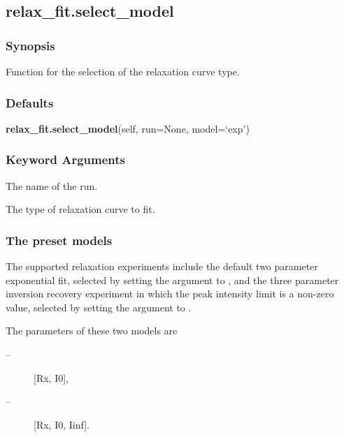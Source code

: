   

 \newpage 

 \subsection{relax\_fit.select\_model} 

  
 \subsubsection{Synopsis} 

 Function for the selection of the relaxation curve type. 
  

  
 \subsubsection{Defaults} 

 \textsf{\textbf{relax\_fit.select\_model}(self, run=None, model=`exp')} 

  
 \subsubsection{Keyword Arguments} 

   The name of the run.   

   The type of relaxation curve to fit.  

  

  
 \subsubsection{The preset models} 

 The supported relaxation experiments include the default two parameter exponential fit, selected by setting the  argument to , and the three parameter inversion recovery experiment in which the peak intensity limit is a non-zero value, selected by setting the argument to . 
  

 The parameters of these two models are 
  

 \begin{description} 
 \item[ --] [Rx, I0],  
 \item[ --] [Rx, I0, Iinf].  
 \end{description} 
  

